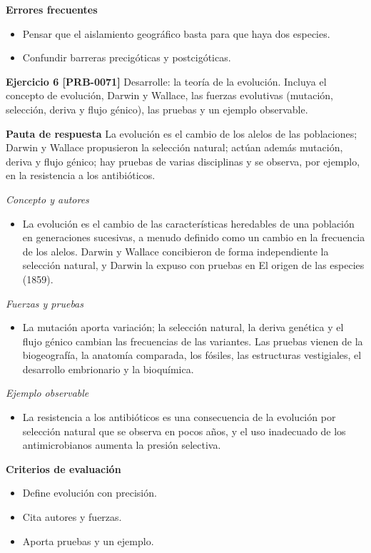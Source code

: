 \documentclass{book}
\begin{document}
\noindent\textbf{Errores frecuentes}
\begin{itemize}
\item Pensar que el aislamiento geográfico basta para que haya dos especies.
\item Confundir barreras precigóticas y postcigóticas.
\end{itemize}

\noindent\textbf{Ejercicio 6 [PRB-0071]}
Desarrolle: la teoría de la evolución. Incluya el concepto de evolución, Darwin y Wallace, las fuerzas evolutivas (mutación, selección, deriva y flujo génico), las pruebas y un ejemplo observable.


\noindent\textbf{Pauta de respuesta}
La evolución es el cambio de los alelos de las poblaciones; Darwin y Wallace propusieron la selección natural; actúan además mutación, deriva y flujo génico; hay pruebas de varias disciplinas y se observa, por ejemplo, en la resistencia a los antibióticos.


\noindent\textit{Concepto y autores}
\begin{itemize}
\item La evolución es el cambio de las características heredables de una población en generaciones sucesivas, a menudo definido como un cambio en la frecuencia de los alelos. Darwin y Wallace concibieron de forma independiente la selección natural, y Darwin la expuso con pruebas en El origen de las especies (1859).
\end{itemize}

\noindent\textit{Fuerzas y pruebas}
\begin{itemize}
\item La mutación aporta variación; la selección natural, la deriva genética y el flujo génico cambian las frecuencias de las variantes. Las pruebas vienen de la biogeografía, la anatomía comparada, los fósiles, las estructuras vestigiales, el desarrollo embrionario y la bioquímica.
\end{itemize}

\noindent\textit{Ejemplo observable}
\begin{itemize}
\item La resistencia a los antibióticos es una consecuencia de la evolución por selección natural que se observa en pocos años, y el uso inadecuado de los antimicrobianos aumenta la presión selectiva.
\end{itemize}

\noindent\textbf{Criterios de evaluación}
\begin{itemize}
\item Define evolución con precisión.
\item Cita autores y fuerzas.
\item Aporta pruebas y un ejemplo.
\end{itemize}
\end{document}
